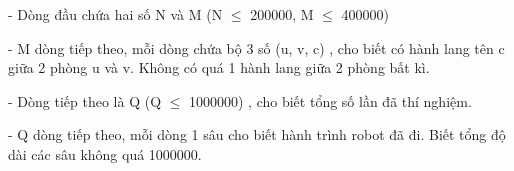 - Dòng đầu chứa hai số N và M (N  $\le$  200000, M  $\le$  400000)

- M dòng tiếp theo, mỗi dòng chứa bộ 3 số (u, v, c) , cho biết có hành lang tên c giữa 2 phòng u và v. Không có quá 1 hành lang giữa 2 phòng bất kì.

- Dòng tiếp theo là Q (Q  $\le$  1000000) , cho biết tổng số lần đã thí nghiệm.

- Q dòng tiếp theo, mỗi dòng 1 sâu cho biết hành trình robot đã đi. Biết tổng độ dài các sâu không quá 1000000.